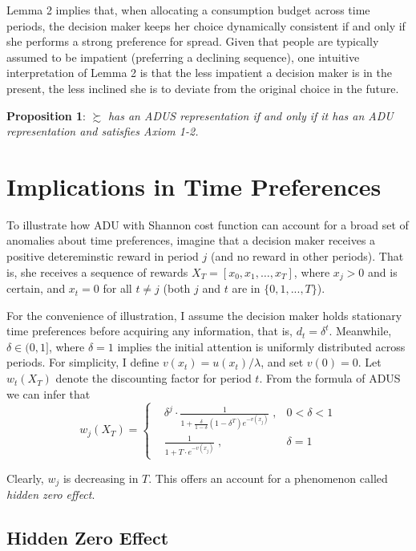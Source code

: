 \documentclass[
  12pt,
]{article}
\begin{document}
Lemma 2 implies that, when allocating a consumption budget across time
periods, the decision maker keeps her choice dynamically consistent if
and only if she performs a strong preference for spread. Given that
people are typically assumed to be impatient (preferring a declining
sequence), one intuitive interpretation of Lemma 2 is that the less
impatient a decision maker is in the present, the less inclined she is
to deviate from the original choice in the future.

\textbf{Proposition 1}: \(\succsim\) \emph{has an ADUS representation if
and only if it has an ADU representation and satisfies Axiom 1-2.}

\hypertarget{implications-in-time-preferences}{%
\section{\texorpdfstring{Implications in Time Preferences
\label{behavioral}}{Implications in Time Preferences }}\label{implications-in-time-preferences}}

To illustrate how ADU with Shannon cost function can account for a broad
set of anomalies about time preferences, imagine that a decision maker
receives a positive detereminstic reward in period \(j\) (and no reward
in other periods). That is, she receives a sequence of rewards
\(X_T=[x_0,x_1,…,x_T]\), where \(x_j>0\) and is certain, and \(x_t = 0\)
for all \(t \neq j\) (both \(j\) and \(t\) are in \(\{0,1,...,T\}\)).

For the convenience of illustration, I assume the decision maker holds
stationary time preferences before acquiring any information, that is,
\(d_t=\delta^t\). Meanwhile, \(\delta\in(0,1]\), where \(\delta=1\)
implies the initial attention is uniformly distributed across periods.
For simplicity, I define \(v(x_t)=u(x_t)/\lambda\), and set \(v(0)=0\).
Let \(w_t(X_T)\) denote the discounting factor for period \(t\). From
the formula of ADUS we can infer that\[ 
w_j(X_T) = \left\{ \begin{aligned}
& \delta^j \cdot\frac{1}{1+\frac{\delta}{1-\delta}(1-\delta^T)e^{-v(x_j)}}\;, & 0<\delta<1 \\
& \frac{1}{1+T\cdot e^{-v(x_j)}}\; , & \delta=1
\end{aligned}
\right.
\]

Clearly, \(w_j\) is decreasing in \(T\). This offers an account for a
phenomenon called \emph{hidden zero effect}.

\hypertarget{hidden-zero-effect}{%
\subsection{Hidden Zero Effect}\label{hidden-zero-effect}}
\end{document}
